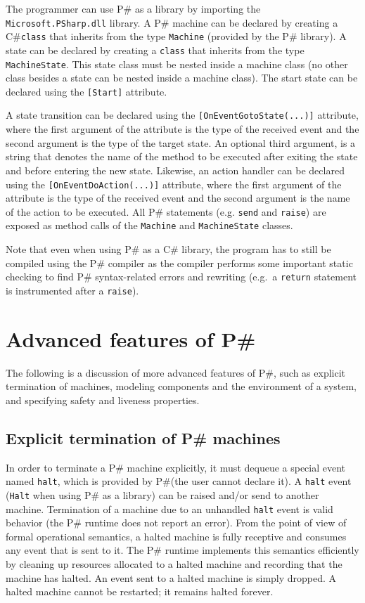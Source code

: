 \documentclass{llncs}
\newcommand{\ps}{P\#\xspace}
\newcommand{\cs}{C\#\xspace}
\begin{document}
The programmer can use \ps as a library by importing the \texttt{Microsoft.PSharp.dll} library. A \ps machine can be declared by creating a \cs \texttt{class} that inherits from the type \texttt{Machine} (provided by the \ps library). A state can be declared by creating a \texttt{class} that inherits from the type \texttt{MachineState}. This state class must be nested inside a machine class (no other class besides a state can be nested inside a machine class). The start state can be declared using the \texttt{[Start]} attribute.

A state transition can be declared using the \texttt{[OnEventGotoState(...)]} attribute, where the first argument of the attribute is the type of the received event and the second argument is the type of the target state. An optional third argument, is a string that denotes the name of the method to be executed after exiting the state and before entering the new state. Likewise, an action handler can be declared using the \texttt{[OnEventDoAction(...)]} attribute, where the first argument of the attribute is the type of the received event and the second argument is the name of the action to be executed. All \ps statements (e.g. \texttt{send} and \texttt{raise}) are exposed as method calls of the \texttt{Machine} and \texttt{MachineState} classes.

Note that even when using \ps as a \cs library, the program has to still be compiled using the \ps compiler as the compiler performs some important static checking to find \ps syntax-related errors and rewriting (e.g.\ a \texttt{return} statement is instrumented after a \texttt{raise}).

\section{Advanced features of \ps}
\label{sec:advanced}

The following is a discussion of more advanced features of \ps, such as explicit termination of machines, modeling components and the environment of a system, and specifying safety and liveness properties.

\subsection{Explicit termination of \ps machines}
\label{sec:termination}

In order to terminate a \ps machine explicitly, it must dequeue a special event named \texttt{halt}, which is provided by \ps (the user cannot declare it). A \texttt{halt} event (\texttt{Halt} when using \ps as a library) can be raised and/or send to another machine. Termination of a machine due to an unhandled \texttt{halt} event is valid behavior (the \ps runtime does not report an error). From the point of view of formal operational semantics, a halted machine is fully receptive and consumes any event that is sent to it. The \ps runtime implements this semantics efficiently by cleaning up resources allocated to a halted machine and recording that the machine has halted. An event sent to a halted machine is simply dropped. A halted machine cannot be restarted; it remains halted forever.
\end{document}
